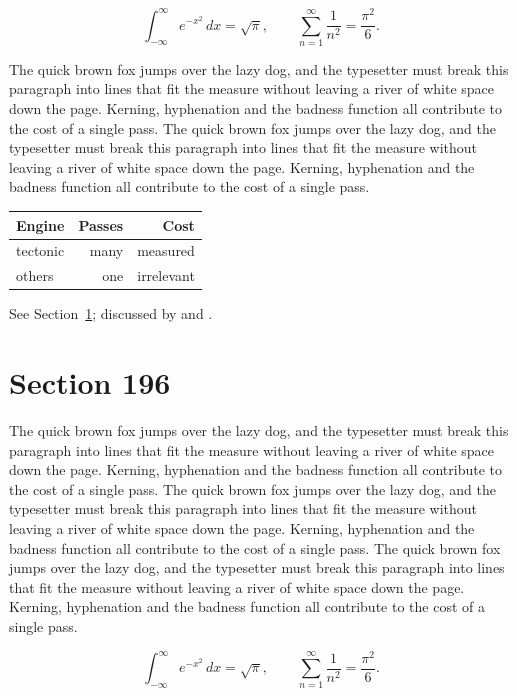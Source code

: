 \documentclass{article}
\begin{document}
\begin{equation}\label{eq:195}
\int_{-\infty}^{\infty} e^{-x^{2}}\,dx = \sqrt{\pi}, \qquad
\sum_{n=1}^{\infty} \frac{1}{n^{2}} = \frac{\pi^{2}}{6}.
\end{equation}

The quick brown fox jumps over the lazy dog, and the typesetter must break this paragraph into lines that fit the measure without leaving a river of white space down the page. Kerning, hyphenation and the badness function all contribute to the cost of a single pass. The quick brown fox jumps over the lazy dog, and the typesetter must break this paragraph into lines that fit the measure without leaving a river of white space down the page. Kerning, hyphenation and the badness function all contribute to the cost of a single pass. 

\begin{center}
\begin{tabular}{lrr}
\toprule
Engine & Passes & Cost \\
\midrule
tectonic & many & measured \\
others & one & irrelevant \\
\bottomrule
\end{tabular}
\end{center}

See Section~\ref{sec:196}; discussed by \textcite{k1} and \textcite{l3}.
\section{Section 196}
\label{sec:196}
The quick brown fox jumps over the lazy dog, and the typesetter must break this paragraph into lines that fit the measure without leaving a river of white space down the page. Kerning, hyphenation and the badness function all contribute to the cost of a single pass. The quick brown fox jumps over the lazy dog, and the typesetter must break this paragraph into lines that fit the measure without leaving a river of white space down the page. Kerning, hyphenation and the badness function all contribute to the cost of a single pass. The quick brown fox jumps over the lazy dog, and the typesetter must break this paragraph into lines that fit the measure without leaving a river of white space down the page. Kerning, hyphenation and the badness function all contribute to the cost of a single pass. 

\begin{equation}\label{eq:196}
\int_{-\infty}^{\infty} e^{-x^{2}}\,dx = \sqrt{\pi}, \qquad
\sum_{n=1}^{\infty} \frac{1}{n^{2}} = \frac{\pi^{2}}{6}.
\end{equation}
\end{document}
